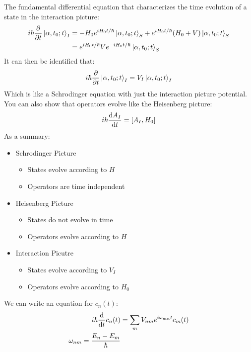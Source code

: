 \documentclass[12pt]{article}
\begin{document}
The fundamental differential equation that characterizes the time evolution of a state in the interaction picture:
\begin{align*}
  i\hbar\pdv{t}\ket{\alpha,t_0;t}_I&=
  -H_0e^{iH_0 t/\hbar}\ket{\alpha,t_0;t}_S
  +e^{iH_0 t/\hbar}(H_0+V)\ket{\alpha,t_0;t}_S\\
  &=e^{iH_0 t/\hbar}Ve^{-iH_0 t/\hbar}\ket{\alpha,t_0;t}_S
\end{align*}
It can then be identified that:
\begin{align*}
  i\hbar\pdv{t}\ket{\alpha,t_0;t}_I=V_I\ket{\alpha,t_0;t}_I
\end{align*}
Which is like a Schrodinger equation with just the interaction picture potential. You can also show that operators evolve like the Heisenberg picture:
\begin{align*}
  i\hbar\dv{A_I}{t}=\comm{A_I}{H_0}
\end{align*}
As a summary:
\begin{itemize}
\item Schrodinger Picture
  \begin{itemize}
  \item States evolve according to $H$
  \item Operators are time independent
  \end{itemize}
\item Heisenberg Picture
  \begin{itemize}
  \item States do not evolve in time
  \item Operators evolve according to $H$
  \end{itemize}
\item Interaction Picutre
  \begin{itemize}
  \item States evolve according to $V_I$
  \item Operators evolve according to $H_0$
  \end{itemize}
\end{itemize}
We can write an equation for $c_n(t)$:
\begin{align*}
  i\hbar\dv{t}c_n(t)&=\sum_m V_{nm}e^{i\omega_{mn}t}c_m(t)\\
  \omega_{nm}=\frac{E_n-E_m}{\hbar}
\end{align*}
\end{document}
